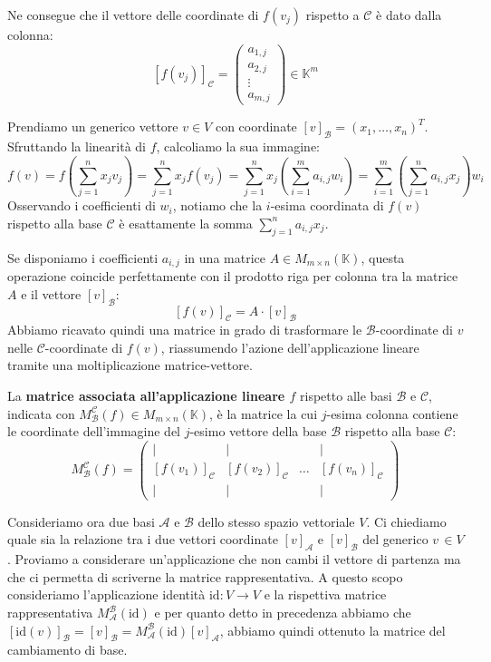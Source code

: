 Ne consegue che il vettore delle coordinate di $f(v_j)$ rispetto a $\mathcal{C}$ è dato dalla colonna:
\[
[f(v_j)]_{\mathcal{C}} = \begin{pmatrix} a_{1,j} \\ a_{2,j} \\ \vdots \\ a_{m,j} \end{pmatrix} \in \mathbb{K}^m
\]

Prendiamo un generico vettore $v \in V$ con coordinate $[v]_{\mathcal{B}} = (x_1, \dots, x_n)^T$. Sfruttando la linearità di $f$, calcoliamo la sua immagine:
\[
f(v) = f\left( \sum_{j=1}^{n} x_j v_j \right) = \sum_{j=1}^{n} x_j f(v_j) = \sum_{j=1}^{n} x_j \left( \sum_{i=1}^{m} a_{i,j} w_i \right) = \sum_{i=1}^{m} \left( \sum_{j=1}^{n} a_{i,j} x_j \right) w_i
\]
Osservando i coefficienti di $w_i$, notiamo che la $i$-esima coordinata di $f(v)$ rispetto alla base $\mathcal{C}$ è esattamente la somma $\sum_{j=1}^{n} a_{i,j} x_j$. 

Se disponiamo i coefficienti $a_{i,j}$ in una matrice $A \in M_{m \times n}(\mathbb{K})$, questa operazione coincide perfettamente con il prodotto riga per colonna tra la matrice $A$ e il vettore $[v]_{\mathcal{B}}$:
\[
[f(v)]_{\mathcal{C}} = A \cdot [v]_{\mathcal{B}}
\]
Abbiamo ricavato quindi una matrice in grado di trasformare le $\mathcal{B}$-coordinate di $v$ nelle $\mathcal{C}$-coordinate di $f(v)$, riassumendo l'azione dell'applicazione lineare tramite una moltiplicazione matrice-vettore.

\begin{definition}
La \textbf{matrice associata all'applicazione lineare $f$} rispetto alle basi $\mathcal{B}$ e $\mathcal{C}$, indicata con $M_{\mathcal{B}}^{\mathcal{C}}(f) \in M_{m \times n}(\mathbb{K})$, è la matrice la cui $j$-esima colonna contiene le coordinate dell'immagine del $j$-esimo vettore della base $\mathcal{B}$ rispetto alla base $\mathcal{C}$:
\[
M_{\mathcal{B}}^{\mathcal{C}}(f) = \begin{pmatrix}
| & | & & | \\
[f(v_1)]_{\mathcal{C}} & [f(v_2)]_{\mathcal{C}} & \dots & [f(v_n)]_{\mathcal{C}} \\
| & | & & |
\end{pmatrix}
\]
\end{definition}
Consideriamo ora due basi $\mathcal{A}$ e $\mathcal{B}$ dello stesso spazio vettoriale $V$. Ci chiediamo quale sia la relazione tra i due vettori coordinate $[v]_{\mathcal{A}}$ e $[v]_{\mathcal{B}}$ del generico $v \, \in V$. Proviamo a considerare un'applicazione che non cambi il vettore di partenza ma che ci permetta di scriverne la matrice rappresentativa. A questo scopo consideriamo l'applicazione identità $\text{id}:V \to V$ e la rispettiva matrice rappresentativa $M_{\mathcal{A}}^{\mathcal{B}}(\text{id})$ e per quanto detto in precedenza abbiamo che $[\text{id}(v)]_{\mathcal{B}}=[v]_{\mathcal{B}}=M_{\mathcal{A}}^{\mathcal{B}}(\text{id})[v]_{\mathcal{A}}$, abbiamo quindi ottenuto la matrice del cambiamento di base.

